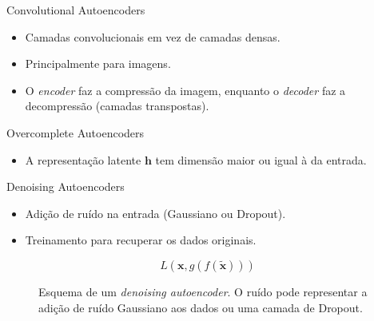\documentclass[dvipsnames]{beamer}
\begin{document}
\begin{frame}{Convolutional Autoencoders}

	\begin{itemize}
		\item Camadas convolucionais em vez de camadas densas.
		\item Principalmente para imagens.
		\item O \emph{encoder} faz a compressão da imagem, enquanto o \emph{decoder} faz a decompressão (camadas transpostas).
	\end{itemize}

\end{frame}

\begin{frame}{Overcomplete Autoencoders}

	\begin{itemize}
		\item A representação latente $\boldsymbol{h}$ tem dimensão maior ou igual à da entrada.
	\end{itemize}

\end{frame}

\begin{frame}{Denoising Autoencoders}

	\begin{itemize}
		\item Adição de ruído na entrada (Gaussiano ou Dropout).
		\item Treinamento para recuperar os dados originais.
	\end{itemize}

    $$L(\boldsymbol{x}, g(f(\tilde{\boldsymbol{x}})))$$

	\begin{figure}

		\centering


        \caption{
			\justifying
			Esquema de um \emph{denoising autoencoder}. O ruído pode representar a adição de ruído Gaussiano aos dados ou uma camada de Dropout.
		}

	\end{figure}

\end{frame}
\end{document}
